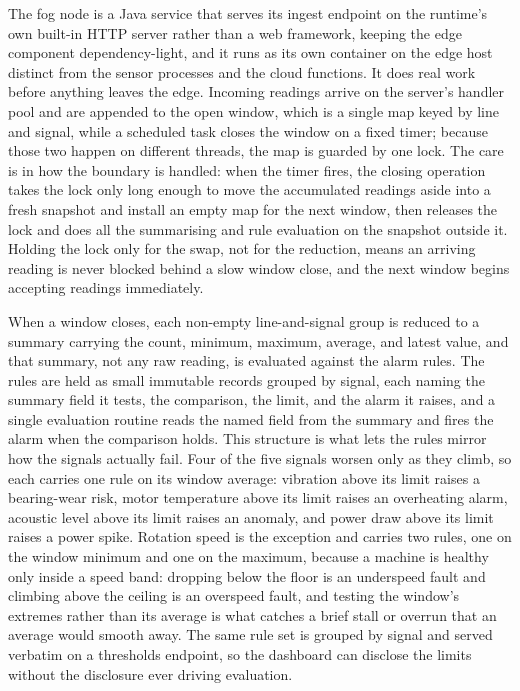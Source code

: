\documentclass[conference]{IEEEtran}
\begin{document}
The fog node is a Java service that serves its ingest endpoint on the runtime's own built-in HTTP server rather than a web framework, keeping the edge component dependency-light, and it runs as its own container on the edge host distinct from the sensor processes and the cloud functions. It does real work before anything leaves the edge. Incoming readings arrive on the server's handler pool and are appended to the open window, which is a single map keyed by line and signal, while a scheduled task closes the window on a fixed timer; because those two happen on different threads, the map is guarded by one lock. The care is in how the boundary is handled: when the timer fires, the closing operation takes the lock only long enough to move the accumulated readings aside into a fresh snapshot and install an empty map for the next window, then releases the lock and does all the summarising and rule evaluation on the snapshot outside it. Holding the lock only for the swap, not for the reduction, means an arriving reading is never blocked behind a slow window close, and the next window begins accepting readings immediately.

When a window closes, each non-empty line-and-signal group is reduced to a summary carrying the count, minimum, maximum, average, and latest value, and that summary, not any raw reading, is evaluated against the alarm rules. The rules are held as small immutable records grouped by signal, each naming the summary field it tests, the comparison, the limit, and the alarm it raises, and a single evaluation routine reads the named field from the summary and fires the alarm when the comparison holds. This structure is what lets the rules mirror how the signals actually fail. Four of the five signals worsen only as they climb, so each carries one rule on its window average: vibration above its limit raises a bearing-wear risk, motor temperature above its limit raises an overheating alarm, acoustic level above its limit raises an anomaly, and power draw above its limit raises a power spike. Rotation speed is the exception and carries two rules, one on the window minimum and one on the maximum, because a machine is healthy only inside a speed band: dropping below the floor is an underspeed fault and climbing above the ceiling is an overspeed fault, and testing the window's extremes rather than its average is what catches a brief stall or overrun that an average would smooth away. The same rule set is grouped by signal and served verbatim on a thresholds endpoint, so the dashboard can disclose the limits without the disclosure ever driving evaluation.
\end{document}
